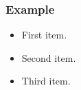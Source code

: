 

\begin{frame}
\frametitle{Example}
\begin{itemize}
\item<1-> First item.
\item<2-> Second item.
\item<3-> Third item.
\end{itemize}
\end{frame}

